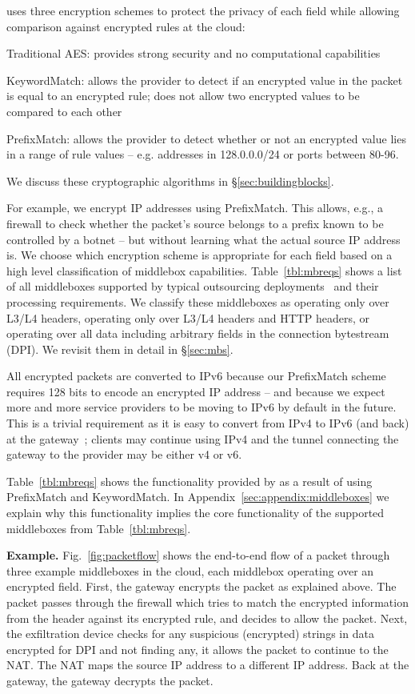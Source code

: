 \sys uses three encryption schemes to protect the privacy of each field while allowing comparison against encrypted rules at the cloud: 

\begin{myitemize}
\item Traditional AES: provides strong security and no computational capabilities
\item KeywordMatch:  allows the provider to detect if an encrypted value in the packet is equal to an encrypted rule; does not allow two encrypted values to be compared to each other
\item PrefixMatch: allows the provider to detect whether or not an encrypted value lies in a range of rule values -- e.g. addresses in 128.0.0.0/24 or ports between 80-96.
\end{myitemize}
We discuss these cryptographic algorithms in \S\ref{sec:buildingblocks}.

For example, we encrypt IP addresses using PrefixMatch. This allows, e.g., a firewall to check whether the packet's source belongs to a prefix known to be controlled by a botnet -- but without learning what the actual source IP address is.
We choose which encryption scheme is appropriate for each field based on a high level classification of middlebox capabilities.
Table~\ref{tbl:mbreqs} shows a list of all middleboxes supported by typical outsourcing deployments~\cite{aplomb} and their processing requirements.
We classify these middleboxes as operating only over L3/L4 headers, operating only over L3/L4 headers and HTTP headers, or operating over all data including arbitrary fields in the connection bytestream (DPI).
We revisit them in detail in \S\ref{sec:mbs}.

All encrypted packets are converted to IPv6 because our PrefixMatch scheme requires 128 bits to encode an encrypted IP address  -- and because we expect more and more service providers to be moving to IPv6 by default in the future.
This is a trivial requirement as it is easy to convert from IPv4 to IPv6 (and back) at the gateway~\cite{siit}; clients may continue using IPv4 and the tunnel connecting the gateway to the provider may be either v4 or v6.

Table~\ref{tbl:mbreqs} shows the functionality provided by \sys as a result of using PrefixMatch and KeywordMatch. In Appendix~\ref{sec:appendix:middleboxes} we explain why this functionality implies the core functionality of the supported middleboxes from Table~\ref{tbl:mbreqs}.


{\bf Example.} Fig.~\ref{fig:packetflow} shows the end-to-end flow of a packet through three example middleboxes in the cloud, each middlebox operating over an encrypted field.  
First,  the gateway encrypts the packet as explained above. The packet passes through the firewall which tries to match the encrypted information from the header against its encrypted rule, and decides to allow the packet. Next, the exfiltration device checks for any suspicious (encrypted) strings in data encrypted for DPI and not finding any, it allows the packet to continue to the NAT. The NAT maps the source IP address to a different IP address. Back at the gateway, the gateway decrypts the packet. 




